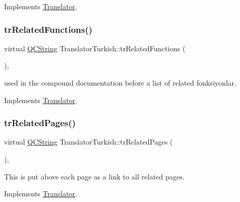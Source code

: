 Implements \mbox{\hyperlink{class_translator}{Translator}}.

\mbox{\label{class_translator_turkish_a2f92f3d9cd532f1b52a81e737c314a35}} 
\subsubsection{\texorpdfstring{trRelatedFunctions()}{trRelatedFunctions()}}
{\footnotesize\ttfamily virtual \mbox{\hyperlink{class_q_c_string}{Q\+C\+String}} Translator\+Turkish\+::tr\+Related\+Functions (\begin{DoxyParamCaption}{ }\end{DoxyParamCaption})\hspace{0.3cm}{\ttfamily [inline]}, {\ttfamily [virtual]}}

used in the compound documentation before a list of related fonksiyonlar. 

Implements \mbox{\hyperlink{class_translator}{Translator}}.

\mbox{\label{class_translator_turkish_a1517458c7647da832b2edde3e58ae9dc}} 
\subsubsection{\texorpdfstring{trRelatedPages()}{trRelatedPages()}}
{\footnotesize\ttfamily virtual \mbox{\hyperlink{class_q_c_string}{Q\+C\+String}} Translator\+Turkish\+::tr\+Related\+Pages (\begin{DoxyParamCaption}{ }\end{DoxyParamCaption})\hspace{0.3cm}{\ttfamily [inline]}, {\ttfamily [virtual]}}

This is put above each page as a link to all related pages. 

Implements \mbox{\hyperlink{class_translator}{Translator}}.

\mbox{\label{class_translator_turkish_a6b77b0e008b1ae2c482c754aaf4c4743}} 
